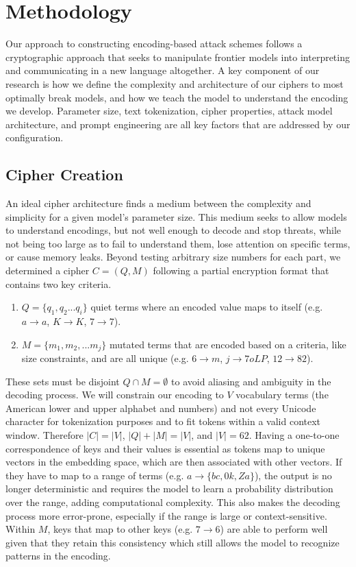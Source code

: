 \documentclass{article} %
\begin{document}
\section{Methodology}
Our approach to constructing encoding-based attack schemes follows a cryptographic approach that seeks to manipulate frontier models into interpreting and communicating in a new language altogether. A key component of our research is how we define the complexity and architecture of our ciphers to most optimally break models, and how we teach the model to understand the encoding we develop. Parameter size, text tokenization, cipher properties, attack model architecture, and prompt engineering are all key factors that are addressed by our configuration.

\subsection{Cipher Creation}
An ideal cipher architecture finds a medium between the complexity and simplicity for a given model's parameter size. This medium seeks to allow models to understand encodings, but not well enough to decode and stop threats, while not being too large as to fail to understand them, lose attention on specific terms, or cause memory leaks. Beyond testing arbitrary size numbers for each part, we determined a cipher $C=(Q,M)$ following a partial encryption format that contains two key criteria. 
\begin{enumerate}
    \item $Q=\{q_1, q_2...q_i\}$ quiet terms where an encoded value maps to itself (e.g. $a \rightarrow a$, $K \rightarrow K$, $7 \rightarrow 7$).
    \item $M=\{m_1, m_2,...m_j\}$ mutated terms that are encoded based on a criteria, like size constraints, and are all unique (e.g. $6 \rightarrow m$, $j \rightarrow 7oLP$, $12 \rightarrow 82$).
\end{enumerate}
These sets must be disjoint $Q \cap M = \emptyset$ to avoid aliasing and ambiguity in the decoding process. We will constrain our encoding to $V$ vocabulary terms (the American lower and upper alphabet and numbers) and not every Unicode character for tokenization purposes and to fit tokens within a valid context window. Therefore $|C| = |V|$, $|Q| + |M| = |V|$, and $|V| = 62$. Having a one-to-one correspondence of keys and their values is essential as tokens map to unique vectors in the embedding space, which are then associated with other vectors. If they have to map to a range of terms (e.g. $a \rightarrow \{bc, 0k, Za\}$), the output is no longer deterministic and requires the model to learn a probability distribution over the range, adding computational complexity. This also makes the decoding process more error-prone, especially if the range is large or context-sensitive. Within $M$, keys that map to other keys (e.g. $7 \rightarrow 6$) are able to perform well given that they retain this consistency which still allows the model to recognize patterns in the encoding. 
\end{document}
